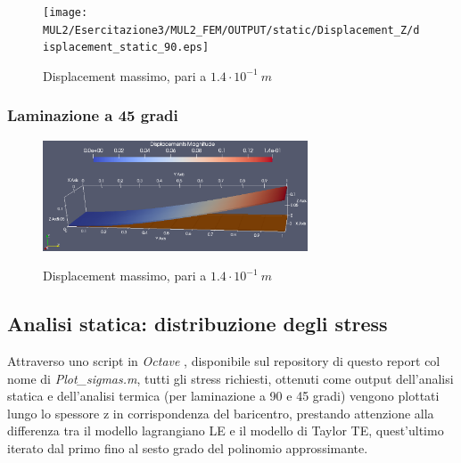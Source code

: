 \documentclass{article}
\begin{document}
            \begin{figure}[h!]
                 \label{fig:displacement_90}
                \centering
                \texttt{[image: MUL2/Esercitazione3/MUL2\_FEM/OUTPUT/static/Displacement\_Z/displacement\_static\_90.eps]}
                \caption{Displacement massimo, pari a $1.4 \cdot 10^{-1} \ m$}
            \end{figure}


            \subsubsection{Laminazione a 45 gradi \label{displacement_massimo_45}}

            \begin{figure}[h!]
                 \label{fig:displacement_45}
                \centering
                \includegraphics[width=0.7\textwidth]{MUL2/Esercitazione3/MUL2_FEM/OUTPUT/static/Displacement_Z/displacement_static_45.eps}
                \caption{Displacement massimo, pari a $1.4 \cdot 10^{-1} \ m$}
            \end{figure}

            \clearpage

            \subsection{Analisi statica: distribuzione degli stress \label{statica_stress}}

            Attraverso uno script in \textit{Octave} \autocite{Octave}, disponibile sul repository di questo report \autocite{Esercitazioni_strutture}
            col nome di \textit{Plot\_sigmas.m}, tutti gli stress richiesti, ottenuti come output dell'analisi statica e dell'analisi termica (per laminazione a 90 e 45 gradi)
            vengono plottati lungo lo spessore z in corrispondenza del baricentro, prestando attenzione alla differenza tra il modello lagrangiano LE
            e il modello di Taylor TE, quest'ultimo iterato dal primo fino al sesto grado del polinomio approssimante.
\end{document}
